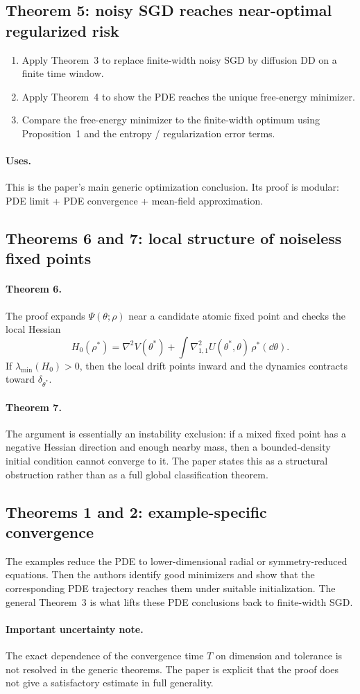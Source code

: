 \subsection*{Theorem 5: noisy SGD reaches near-optimal regularized risk}
\begin{enumerate}[label=\arabic*.]
\item Apply Theorem~3 to replace finite-width noisy SGD by diffusion DD on a finite time window.
\item Apply Theorem~4 to show the PDE reaches the unique free-energy minimizer.
\item Compare the free-energy minimizer to the finite-width optimum using Proposition~1 and the entropy / regularization error terms.
\end{enumerate}
\paragraph{Uses.}
This is the paper's main generic optimization conclusion. Its proof is modular: PDE limit + PDE convergence + mean-field approximation.

\subsection*{Theorems 6 and 7: local structure of noiseless fixed points}
\paragraph{Theorem 6.}
The proof expands $\Psi(\theta;\rho)$ near a candidate atomic fixed point and checks the local Hessian
\begin{equation}
H_0(\rho^*)=\nabla^2 V(\theta^*)+\int \nabla^2_{1,1}U(\theta^*,\theta)\,\rho^*(\dd\theta).
\end{equation}
If $\lambda_{\min}(H_0)>0$, then the local drift points inward and the dynamics contracts toward $\delta_{\theta^*}$.

\paragraph{Theorem 7.}
The argument is essentially an instability exclusion: if a mixed fixed point has a negative Hessian direction and enough nearby mass, then a bounded-density initial condition cannot converge to it. The paper states this as a structural obstruction rather than as a full global classification theorem.

\subsection*{Theorems 1 and 2: example-specific convergence}
The examples reduce the PDE to lower-dimensional radial or symmetry-reduced equations. Then the authors identify good minimizers and show that the corresponding PDE trajectory reaches them under suitable initialization. The general Theorem~3 is what lifts these PDE conclusions back to finite-width SGD.

\paragraph{Important uncertainty note.}
The exact dependence of the convergence time $T$ on dimension and tolerance is not resolved in the generic theorems. The paper is explicit that the proof does not give a satisfactory estimate in full generality.
